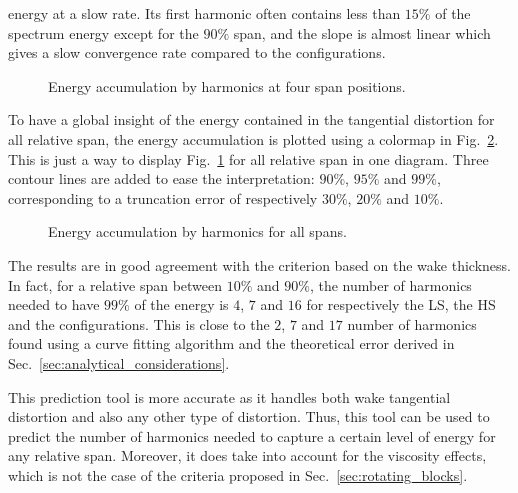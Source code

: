 energy at a slow rate. Its first harmonic often contains less
than $15\%$ of the spectrum energy except for the $90\%$ span,
and the slope is almost linear which
gives a slow convergence rate compared to the \mockup configurations.
\begin{figure}[htbp]
  \centering
  \quad
  \quad
  \quad
  \quad
  \caption{Energy accumulation by harmonics at four span positions.}
  \label{fig:crorroxvcurves}
\end{figure}

To have a global insight of the energy contained in the
tangential distortion for all relative span,
the energy accumulation is plotted using a colormap
in Fig.~\ref{fig:crorroxvmapenergy}. This is just
a way to display Fig.~\ref{fig:crorroxvcurves} for all
relative span in one diagram.
Three contour lines are added to ease the
interpretation: $90\%$, $95\%$
and $99\%$, corresponding to a truncation
error of respectively $30\%$, $20\%$ and $10\%$.
\begin{figure}[htbp]
  \centering
  \caption{Energy accumulation by harmonics for all spans.}
  \label{fig:crorroxvmapenergy}
\end{figure}
The results are in good agreement with the criterion
based on the wake thickness. In fact, for a relative
span between $10\%$ and $90\%$, the number of harmonics
needed to have $99\%$ of the energy is $4$, $7$ and $16$
for respectively the \mockup LS, the \mockup HS and the
\aipx configurations. This is close to the $2$, $7$ and
$17$ number of harmonics found using a curve fitting
algorithm and the theoretical error derived in 
Sec.~\ref{sec:analytical_considerations}.

This prediction tool is more accurate as it handles
both wake tangential distortion and also any other
type of distortion. Thus, this tool can be used to predict
the number of harmonics needed to capture a certain
level of energy for any relative span.
Moreover, it does take into account for the
viscosity effects, which is not the case of the criteria
proposed in Sec.~\ref{sec:rotating_blocks}.

